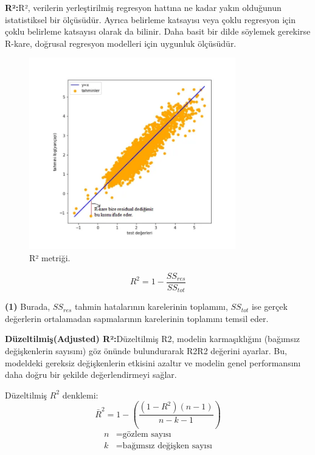 \documentclass[12pt, a4paper]{article}
\begin{document}
	\textbf{R²:}R², verilerin yerleştirilmiş regresyon hattına ne kadar yakın olduğunun istatistiksel bir ölçüsüdür. Ayrıca belirleme katsayısı veya çoklu regresyon için çoklu belirleme katsayısı olarak da bilinir. Daha basit bir dilde söylemek gerekirse R-kare, doğrusal regresyon modelleri için uygunluk ölçüsüdür.
	\begin{figure}[!h]
		\centering
		\includegraphics[width=0.8\textwidth, height=0.4\textheight]{6.9.png}
		\caption{R² metriği.}
	\end{figure}\cite{r2}
	\newpage
	\begin{equation}
		R^2 = 1 - \frac{SS_{res}}{SS_{tot}}
	\end{equation}
	\begin{center}
		\textbf{(1)} Burada, $SS_{res}$ tahmin hatalarının karelerinin toplamını, $SS_{tot}$ ise gerçek değerlerin ortalamadan sapmalarının karelerinin toplamını temsil eder.
	\end{center}
	\textbf{Düzeltilmiş(Adjusted) R²:}Düzeltilmiş R2, modelin karmaşıklığını (bağımsız değişkenlerin sayısını) göz önünde bulundurarak R2R2 değerini ayarlar. Bu, modeldeki gereksiz değişkenlerin etkisini azaltır ve modelin genel performansını daha doğru bir şekilde değerlendirmeyi sağlar.\cite{Duzelr2}
	
	Düzeltilmiş \( R^2 \) denklemi:
	\[
	\bar{R}^2 = 1 - \left( \frac{(1 - R^2)(n - 1)}{n - k - 1} \right)
	\]
	\begin{align*}
		n &= \text{gözlem sayısı} \\
		k &= \text{bağımsız değişken sayısı}
	\end{align*}
	
\end{document}
